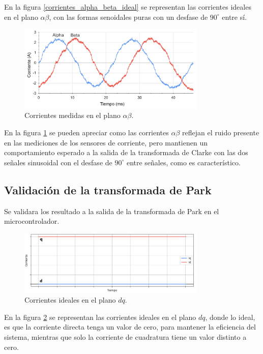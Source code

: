 \documentclass[11pt]{report}
\begin{document}
En la figura \ref{corrientes_alpha_beta_ideal} se representan las corrientes ideales en el plano $\alpha\beta$, con las formas senoidales puras con un desfase de $90^\circ$ entre sí.

\begin{figure}[ht]
	\centering
	\includegraphics[width=0.8\textwidth]{imagenes/Corrientes_AlphaBeta.png}
	\caption{Corrientes medidas en el plano $\alpha\beta$.}
	\label{corrientes_alpha_beta}
\end{figure}
\FloatBarrier

En la figura \ref{corrientes_alpha_beta} se pueden apreciar como las corrientes $\alpha\beta$ reflejan el ruido presente en las mediciones de los sensores de corriente, pero mantienen un comportamiento esperado a la salida de la transformada de Clarke con las dos señales sinusoidal con el desfase de $90^\circ$ entre señales, como es característico.

\newpage
\subsection{Validación de la transformada de Park}

Se validara los resultado a la salida de la transformada de Park en el microcontrolador.

\begin{figure}[ht]
	\centering
	\includegraphics[width=0.8\textwidth]{imagenes/Corrientes_dq_ideal.png}
	\caption{Corrientes ideales en el plano $dq$.}
	\label{corrientes_dq_ideal}
\end{figure}
\FloatBarrier

En la figura \ref{corrientes_dq_ideal} se representan las corrientes ideales en el plano $dq$, donde lo ideal, es que la corriente directa tenga un valor de cero, para mantener la eficiencia del sistema, mientras que solo la corriente de cuadratura tiene un valor distinto a cero.
\end{document}
